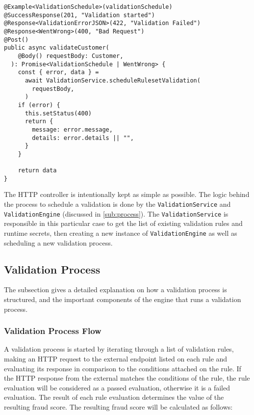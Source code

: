     \begin{lstlisting}[style=es6, caption={HTTP controller to schedule a validation process (TypeScript)}]
@Example<ValidationSchedule>(validationSchedule)
@SuccessResponse(201, "Validation started")
@Response<ValidationErrorJSON>(422, "Validation Failed")
@Response<WentWrong>(400, "Bad Request")
@Post()
public async validateCustomer(
    @Body() requestBody: Customer,
  ): Promise<ValidationSchedule | WentWrong> {
    const { error, data } =
      await ValidationService.scheduleRulesetValidation(
        requestBody,
      )
    if (error) {
      this.setStatus(400)
      return {
        message: error.message,
        details: error.details || "",
      }
    }

    return data
}
\end{lstlisting}

    The HTTP controller is intentionally kept as simple as possible. The logic behind the process to schedule a validation is done by the \verb;ValidationService; and \verb;ValidationEngine; (discussed in \autoref{sub:process}). The \verb;ValidationService; is responsible in this particular case to get the list of existing validation rules and runtime secrets, then creating a new instance of \verb;ValidationEngine; as well as scheduling a new validation process. 

  \subsection{Validation Process}
    \label{sub:process}
    
    The subsection gives a detailed explanation on how a validation process is structured, and the important components of the engine that runs a validation process. 

    \subsubsection{Validation Process Flow}
      \label{impl_cl:flow}
    
      A validation process is started by iterating through a list of validation rules, making an HTTP request to the external endpoint listed on each rule and evaluating its response in comparison to the conditions attached on the rule. If the HTTP response from the external matches the conditions of the rule, the rule evaluation will be considered as a passed evaluation, otherwise it is a failed evaluation. The result of each rule evaluation determines the value of the resulting fraud score. The resulting fraud score will be calculated as follows: 

